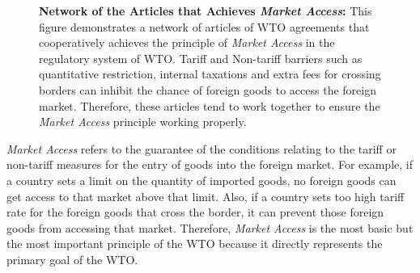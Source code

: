 
\begin{figure}[ht]
    \centering{
        
    }
    \caption{{\bf Network of the Articles that Achieves \textit{Market Access}:}
        This figure demonstrates a network of articles of WTO agreements
        that cooperatively achieves the principle of \textit{Market Access} in the regulatory system of WTO.
        Tariff and Non-tariff barriers such as quantitative restriction, internal taxations
        and extra fees for crossing borders can inhibit the chance of foreign goods to access the foreign market.
        Therefore, these articles tend to work together to ensure the \textit{Market Access} principle working properly.
    }
    \label{fig:market-aceess_directed}
  \end{figure}
 \textit{Market Access}
 refers to the guarantee of the conditions relating to the
 tariff or non-tariff measures
 for the entry of
 goods into the foreign market. For example, if
 a country sets a limit on the quantity of imported goods, no foreign goods can get access to that market above that limit. Also, if a country sets too high tariff rate for the foreign goods that cross the border,
 it can prevent those foreign goods from accessing that market.
 Therefore, \textit{Market Access} is the most basic but the most important principle of the WTO
 because it directly represents the primary goal of the WTO.
  
